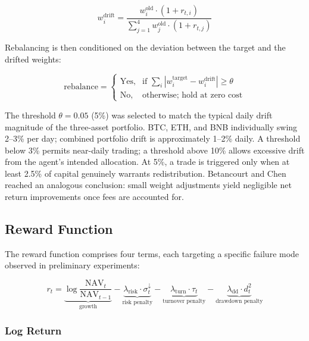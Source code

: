 \documentclass[pdflatex,sn-mathphys-num]{sn-jnl}
\begin{document}
\begin{equation}\label{eq:drift}
    w_i^{\mathrm{drift}} = \frac{w_i^{\mathrm{old}} \cdot (1 + r_{t,i})}
    {\sum_{j=1}^{4} w_j^{\mathrm{old}} \cdot (1 + r_{t,j})}
\end{equation}

Rebalancing is then conditioned on the deviation between the target and the
drifted weights:

\begin{equation}\label{eq:rebalance_rule}
    \mathrm{rebalance} = \begin{cases}
        \text{Yes},  & \text{if } \sum_{i} |w_{i}^{\mathrm{target}} - w_{i}^{\mathrm{drift}}|
        \geq \theta \\[4pt]
        \text{No}, & \text{otherwise; hold at zero cost}
    \end{cases}
\end{equation}

The threshold $\theta = 0.05$ (5\%) was selected to match the typical
daily drift magnitude of the three-asset portfolio. BTC, ETH, and BNB
individually swing 2--3\% per day; combined portfolio drift is approximately
1--2\% daily. A threshold below 3\% permits near-daily trading; a threshold
above 10\% allows excessive drift from the agent's intended allocation. At 5\%,
a trade is triggered only when at least 2.5\% of capital genuinely warrants
redistribution. Betancourt and Chen \cite{betancourt2021deep} reached an
analogous conclusion: small weight adjustments yield negligible net return
improvements once fees are accounted for.

\subsection{Reward Function}\label{sec:reward}

The reward function comprises four terms, each targeting a specific
failure mode observed in preliminary experiments:

\begin{equation}\label{eq:reward}
    r_t = \underbrace{\log\frac{\mathrm{NAV}_t}{\mathrm{NAV}_{t-1}}}_{\text{growth}}
    - \underbrace{\lambda_{\mathrm{risk}} \cdot \sigma_t^{\downarrow}}_{\text{risk penalty}}
    - \underbrace{\lambda_{\mathrm{turn}} \cdot \tau_t}_{\text{turnover penalty}}
    - \underbrace{\lambda_{\mathrm{dd}} \cdot d_t^2}_{\text{drawdown penalty}}
\end{equation}

\subsubsection{Log Return}
\end{document}
